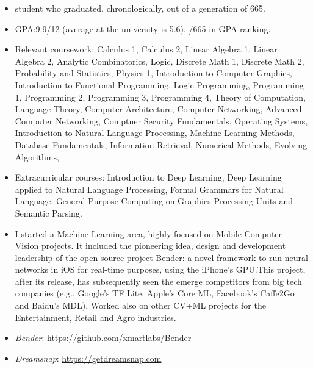 \documentclass[10pt,a4paper,academicons]{altacv}
\begin{document}
\begin{itemize}
  \item {} student who graduated, chronologically, out of a generation of 665.

  \item GPA:\@ 9.9/12 (average at the university is 5.6). /665 in GPA ranking.

  \item Relevant coursework: Calculus 1, Calculus 2, Linear Algebra 1, Linear Algebra 2, Analytic Combinatorics, Logic, Discrete Math 1, Discrete Math 2, Probability and Statistics, Physics 1, Introduction to Computer Graphics, Introduction to Functional Programming, Logic Programming, Programming 1, Programming 2, Programming 3, Programming 4, Theory of Computation, Language Theory, Computer Architecture, Computer Networking, Advanced Computer Networking, Comptuer Security Fundamentals, Operating Systems, Introduction to Natural Language Processing, Machine Learning Methods, Database Fundamentals, Information Retrieval, Numerical Methods, Evolving Algorithms, 

  \item Extracurricular courses: Introduction to Deep Learning, Deep Learning applied to Natural
  Language Processing, Formal Grammars for Natural Language, General-Purpose Computing on
  Graphics Processing Units and Semantic Parsing.
\end{itemize}



\begin{itemize}
  \item I started a Machine Learning area, highly focused on Mobile Computer Vision projects. It included the pioneering idea, design and development leadership of the open source project Bender: a novel framework to run neural networks in iOS for real-time purposes, using the iPhone’s GPU.\@ This project, after its release, has subsequently seen the emerge competitors from big tech companies (e.g., Google’s TF Lite, Apple’s Core ML, Facebook’s Caffe2Go and Baidu’s MDL). Worked also on other CV+ML projects for the Entertainment, Retail and Agro industries.
  \item \emph{Bender}: \url{https://github.com/xmartlabs/Bender}
  \item \emph{Dreamsnap}: \url{https://getdreamsnap.com}
\end{itemize}
\end{document}
